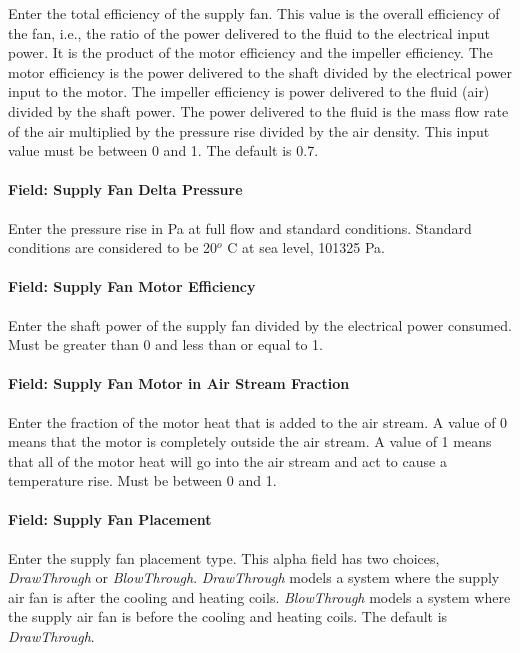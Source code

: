 Enter the total efficiency of the supply fan. This value is the overall efficiency of the fan, i.e., the ratio of the power delivered to the fluid to the electrical input power. It is the product of the motor efficiency and the impeller efficiency. The motor efficiency is the power delivered to the shaft divided by the electrical power input to the motor. The impeller efficiency is power delivered to the fluid (air) divided by the shaft power. The power delivered to the fluid is the mass flow rate of the air multiplied by the pressure rise divided by the air density. This input value must be between 0 and 1. The default is 0.7.

\paragraph{Field: Supply Fan Delta Pressure}\label{field-supply-fan-delta-pressure-10}

Enter the pressure rise in Pa at full flow and standard conditions. Standard conditions are considered to be 20\(^{o}\) C at sea level, 101325 Pa.

\paragraph{Field: Supply Fan Motor Efficiency}\label{field-supply-fan-motor-efficiency-11}

Enter the shaft power of the supply fan divided by the electrical power consumed. Must be greater than 0 and less than or equal to 1.

\paragraph{Field: Supply Fan Motor in Air Stream Fraction}\label{field-supply-fan-motor-in-air-stream-fraction-7}

Enter the fraction of the motor heat that is added to the air stream. A value of 0 means that the motor is completely outside the air stream. A value of 1 means that all of the motor heat will go into the air stream and act to cause a temperature rise. Must be between 0 and 1.

\paragraph{Field: Supply Fan Placement}\label{field-supply-fan-placement-10}

Enter the supply fan placement type. This alpha field has two choices, \emph{DrawThrough} or \emph{BlowThrough}. \emph{DrawThrough} models a system where the supply air fan is after the cooling and heating coils. \emph{BlowThrough} models a system where the supply air fan is before the cooling and heating coils. The default is \emph{DrawThrough}.

